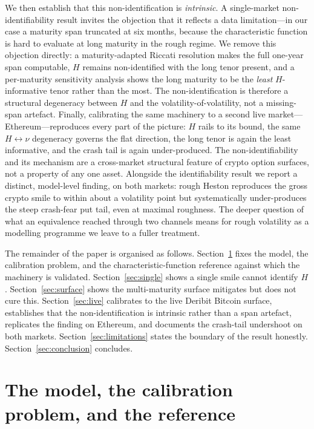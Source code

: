 \documentclass[namedate,webpdf]{ima-authoring-template}
\numberwithin{equation}{section}
\begin{document}
We then establish that this non-identification is \emph{intrinsic}. A single-market
non-identifiability result invites the objection that it reflects a data limitation---in
our case a maturity span truncated at six months, because the characteristic function is
hard to evaluate at long maturity in the rough regime. We remove this objection directly:
a maturity-adapted Riccati resolution makes the full one-year span computable, $H$ remains
non-identified with the long tenor present, and a per-maturity sensitivity analysis shows
the long maturity to be the \emph{least} $H$-informative tenor rather than the most. The
non-identification is therefore a structural degeneracy between $H$ and the
volatility-of-volatility, not a missing-span artefact. Finally, calibrating the same
machinery to a second live market---Ethereum---reproduces every part of the picture: $H$
rails to its bound, the same $H\leftrightarrow\nu$ degeneracy governs the flat direction,
the long tenor is again the least informative, and the crash tail is again under-produced.
The non-identifiability and its mechanism are a cross-market structural feature of crypto
option surfaces, not a property of any one asset. Alongside the identifiability result we
report a distinct, model-level finding, on both markets: rough Heston reproduces the gross
crypto smile to within about a volatility point but systematically under-produces the steep
crash-fear put tail, even at maximal roughness. The deeper question of what an equivalence
reached through two channels means for rough volatility as a modelling programme we leave to
a fuller treatment.

The remainder of the paper is organised as follows.
Section~\ref{sec:setup} fixes the model, the calibration problem, and the
characteristic-function reference against which the machinery is validated.
Section~\ref{sec:single} shows a single smile cannot identify $H$.
Section~\ref{sec:surface} shows the multi-maturity surface mitigates but does not cure this.
Section~\ref{sec:live} calibrates to the live Deribit Bitcoin surface, establishes that the
non-identification is intrinsic rather than a span artefact, replicates the finding on
Ethereum, and documents the crash-tail undershoot on both markets.
Section~\ref{sec:limitations} states the boundary of the result honestly.
Section~\ref{sec:conclusion} concludes.

\section{The model, the calibration problem, and the reference}\label{sec:setup}
\end{document}
